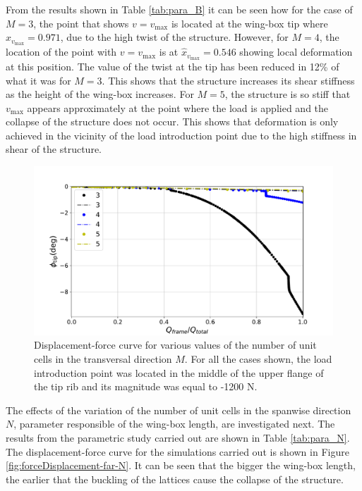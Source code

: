     From the results shown in Table \ref{tab:para_B} it can be seen how for the case of $M = 3$, the point that shows $v = v_{\mathrm{max}}$ is located at the wing-box tip where $\hat{x}_{v_{\mathrm{max}}} = 0.971$, due to the high twist of the structure. However, for $M = 4$, the location of the point with $v = v_{\mathrm{max}}$ is at $\hat{x}_{v_{\mathrm{max}}} = 0.546$ showing local deformation at this position. The value of the twist at the tip \phinonlin has been reduced in 12\% of what it was for $M = 3$. This shows that the structure increases its shear stiffness as the height of the wing-box increases. For $M = 5$, the structure is so stiff that $v_{\mathrm{max}}$ appears approximately at the point where the load is applied and the collapse of the structure does not occur. This shows that deformation is only achieved in the vicinity of the load introduction point due to the high stiffness in shear of the structure.

    \begin{figure}[!htpb] %
      \centering
      \includegraphics[width=0.8 \textwidth]{figures/../figures/result-sim/M/force_displacement-far-1200N}
      \caption[Displacement-force curve for various values of the number of unit cells in the transversal direction]{Displacement-force curve for various values of the number of unit cells in the transversal direction $M$. For all the cases shown, the load introduction point was located in the middle of the upper flange of the tip rib and its magnitude was equal to -1200 N.}\label{fig:forceDisplacement-far-M}
    \end{figure}

    \clearpage
    The effects of the variation of the number of unit cells in the spanwise direction $N$, parameter responsible of the wing-box length, are investigated next. The results from the parametric study carried out are shown in Table \ref{tab:para_N}. The displacement-force curve for the simulations carried out is shown in Figure \ref{fig:forceDisplacement-far-N}. It can be seen that the bigger the wing-box length, the earlier that the buckling of the lattices cause the collapse of the structure.

